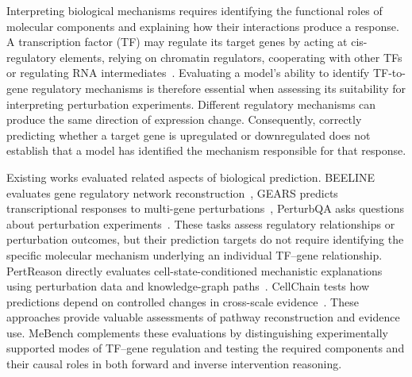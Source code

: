 
Interpreting biological mechanisms requires identifying the functional roles of molecular components and explaining how their interactions produce a response. A transcription factor (TF) may regulate its target genes by acting at cis-regulatory elements, relying on chromatin regulators, cooperating with other TFs or regulating RNA intermediates~\cite{dong2025znf143,gallant2012deltanp63alpha,biddie2011transcription,yoshioka2012micromanaging}. Evaluating a model's ability to identify TF-to-gene regulatory mechanisms is therefore essential when assessing its suitability for interpreting perturbation experiments. Different regulatory mechanisms can produce the same direction of expression change. Consequently, correctly predicting whether a target gene is upregulated or downregulated does not establish that a model has identified the mechanism responsible for that response.

Existing works evaluated related aspects of biological prediction. BEELINE evaluates gene regulatory network reconstruction~\cite{pratapa2020benchmarking}, GEARS predicts transcriptional responses to multi-gene perturbations~\cite{roohani2024predicting}, PerturbQA asks questions about perturbation experiments~\cite{wu2025contextualizing}.  These tasks assess regulatory relationships or perturbation outcomes, but their prediction targets do not require identifying the specific molecular mechanism underlying an individual TF–gene relationship. PertReason directly evaluates cell-state-conditioned mechanistic explanations using perturbation data and knowledge-graph paths~\cite{kim2026pertreason}. CellChain tests how predictions depend on controlled changes in cross-scale evidence~\cite{xia2026cellchain}. These approaches provide valuable assessments of pathway reconstruction and evidence use. MeBench complements these evaluations by distinguishing experimentally supported modes of TF--gene regulation and testing the required components and their causal roles in both forward and inverse intervention reasoning. 


